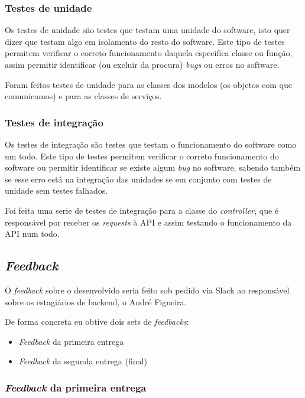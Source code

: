 \subsubsection{Testes de unidade}

Os testes de unidade são testes que testam uma unidade do software, isto quer dizer que testam algo em isolamento do resto do software. Este tipo de testes permitem verificar o correto funcionamento daquela especifica classe ou função, assim permitir identificar (ou excluir da procura) \textit{bugs} ou erros no software.

Foram feitos testes de unidade para as classes dos modelos (os objetos com que comunicamos) e para as classes de serviços.

\subsubsection{Testes de integração}

Os testes de integração são testes que testam o funcionamento do software como um todo. Este tipo de testes permitem verificar o correto funcionamento do software ou permitir identificar se existe algum \textit{bug} no software, sabendo também se esse erro está na integração das unidades se em conjunto com testes de unidade sem testes falhados.

Foi feita uma serie de testes de integração para a classe do \textit{controller}, que é responsável por receber os \textit{requests} à API e assim testando o funcionamento da API num todo.

\subsection{\textit{Feedback}}

O \textit{feedback} sobre o desenvolvido seria feito sob pedido via Slack ao responsável sobre os estagiários de backend, o André Figueira.

De forma concreta eu obtive dois sets de \textit{feedbacks}:

\begin{itemize}
  \item \textit{Feedback} da primeira entrega
  \item \textit{Feedback} da segunda entrega (final)
\end{itemize}

\subsubsection{\textit{Feedback} da primeira entrega}

